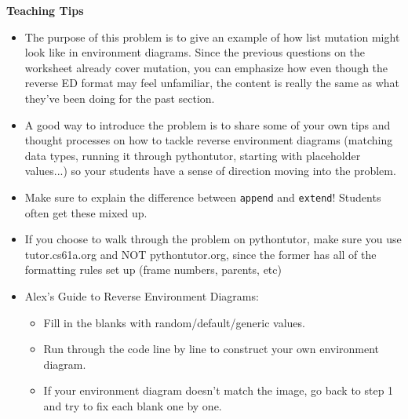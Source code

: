 \begin{guide}
    \begin{blocksection}
    \textbf{Teaching Tips}
    
    \begin{itemize}
    \item The purpose of this problem is to give an example of how list mutation might look like in environment diagrams. 
    Since the previous questions on the worksheet already cover mutation, you can emphasize how even though the reverse ED format may feel unfamiliar, 
    the content is really the same as what they've been doing for the past section.
    \item A good way to introduce the problem is to share some of your own tips and thought processes on how to tackle reverse environment diagrams 
    (matching data types, running it through pythontutor, starting with placeholder values...) so your students have a sense of direction moving into the problem.
    \item Make sure to explain the difference between \lstinline{append} and \lstinline{extend}! Students often get these mixed up.
    \item If you choose to walk through the problem on pythontutor, make sure you use tutor.cs61a.org and NOT pythontutor.org, since the former has all of the formatting
          rules set up (frame numbers, parents, etc)
    \item Alex's Guide to Reverse Environment Diagrams:
        \begin{itemize}
            \item Fill in the blanks with random/default/generic values.
            \item Run through the code line by line to construct your own environment diagram.
            \item If your environment diagram doesn't match the image, go back to step 1 and try to fix each blank one by one.
        \end{itemize}
    \end{itemize}
    \end{blocksection}
    \end{guide}